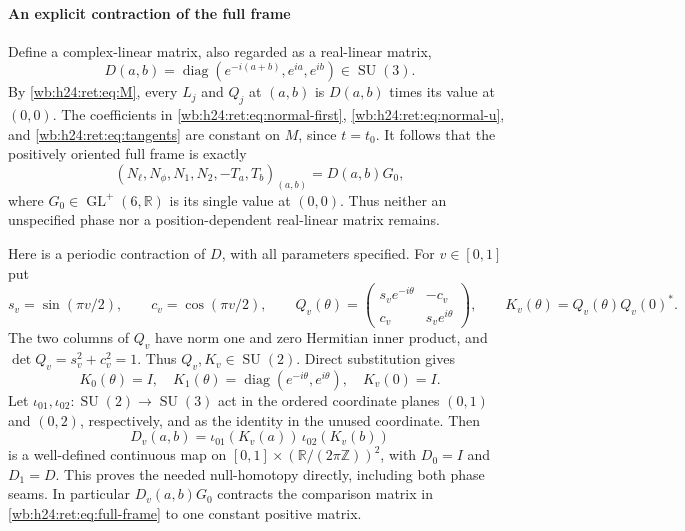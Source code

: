 \paragraph{An explicit contraction of the full frame}

Define a complex-linear matrix, also regarded as a real-linear matrix,
\begin{equation}
 D(a,b)=\operatorname{diag}(e^{-i(a+b)},e^{ia},e^{ib})\in\operatorname{SU}(3).
 \label{wb:h24:ret:eq:D}
\end{equation}
By \eqref{wb:h24:ret:eq:M}, every \(L_j\) and \(Q_j\) at \((a,b)\) is
\(D(a,b)\) times its value at \((0,0)\).  The coefficients in
\eqref{wb:h24:ret:eq:normal-first}, \eqref{wb:h24:ret:eq:normal-u}, and
\eqref{wb:h24:ret:eq:tangents} are constant on \(M\), since \(t=t_0\).
It follows that the positively oriented full frame is exactly
\begin{equation}
 (N_\ell,N_\phi,N_1,N_2,-T_a,T_b)_{(a,b)}
       =D(a,b)G_0,
 \label{wb:h24:ret:eq:full-frame}
\end{equation}
where \(G_0\in\operatorname{GL}^+(6,\mathbb R)\) is its single value at \((0,0)\).
Thus neither an unspecified phase nor a position-dependent
real-linear matrix remains.

Here is a periodic contraction of \(D\), with all parameters
specified.  For \(v\in[0,1]\) put
\[
 s_v=\sin(\pi v/2),\qquad c_v=\cos(\pi v/2),\qquad
 Q_v(\theta)=
 \begin{pmatrix}s_ve^{-i\theta}&-c_v\\c_v&s_ve^{i\theta}\end{pmatrix},
 \qquad K_v(\theta)=Q_v(\theta)Q_v(0)^*.
\]
The two columns of \(Q_v\) have norm one and zero Hermitian inner
product, and \(\det Q_v=s_v^2+c_v^2=1\).  Thus
\(Q_v,K_v\in\operatorname{SU}(2)\).  Direct substitution gives
\[
 K_0(\theta)=I,\quad
 K_1(\theta)=\operatorname{diag}(e^{-i\theta},e^{i\theta}),\quad
 K_v(0)=I.
\]
Let \(\iota_{01},\iota_{02}:\operatorname{SU}(2)\to\operatorname{SU}(3)\) act in the
ordered coordinate planes \((0,1)\) and \((0,2)\), respectively,
and as the identity in the unused coordinate.  Then
\begin{equation}
 D_v(a,b)=\iota_{01}(K_v(a))\,\iota_{02}(K_v(b))
 \label{wb:h24:ret:eq:D-homotopy}
\end{equation}
is a well-defined continuous map on
\([0,1]\times(\mathbb R/(2\pi\mathbb Z))^2\), with
\(D_0=I\) and \(D_1=D\).  This proves the needed null-homotopy
directly, including both phase seams.  In particular
\(D_v(a,b)G_0\) contracts the comparison matrix in
\eqref{wb:h24:ret:eq:full-frame} to one constant positive matrix.

